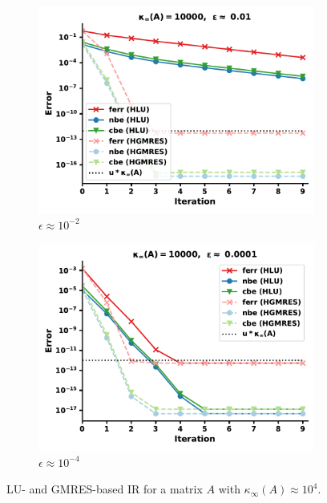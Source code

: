 \begin{figure}[h]
\centering
\begin{subfigure}{.5\textwidth}
  \centering
  \includegraphics[width=\linewidth]{chapters/5_experiments/figures/LR512e1_0.pdf}
  \caption{$\epsilon \approx 10^{-2}$}
  \label{fig:lrir2_1}
\end{subfigure}%
\begin{subfigure}{.5\textwidth}
  \centering
  \includegraphics[width=\linewidth]{chapters/5_experiments/figures/LR512e1_1.pdf}
  \caption{$\epsilon \approx 10^{-4}$}
  \label{fig:lrir2_2}
\end{subfigure}
\caption[Low-Rank IR 2]{LU- and GMRES-based IR for a matrix $A$ with $\kappa_\infty(A) \approx 10^4$.}
\label{fig:lrir2}
\end{figure}

